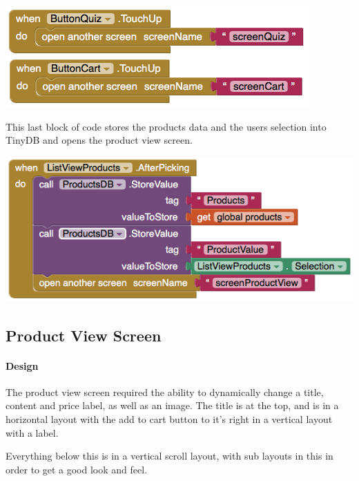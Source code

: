 \documentclass{scrreprt}
\begin{document}
\begin{center}
    \includegraphics[width=0.75\linewidth]{images/mainNavigation.png}
\end{center}

This last block of code stores the products data and the users selection into TinyDB and opens the product view screen.

\begin{center}
    \includegraphics[width=0.75\linewidth]{images/mainDatabase.png}
\end{center}

\subsection{Product View Screen}

\paragraph{Design}

The product view screen required the ability to dynamically change a title, content and price label, as well as an image. The title is at the top, and is in a horizontal layout with the add to cart button to it's right in a vertical layout with a label.

Everything below this is in a vertical scroll layout, with sub layouts in this in order to get a good look and feel.
\end{document}
